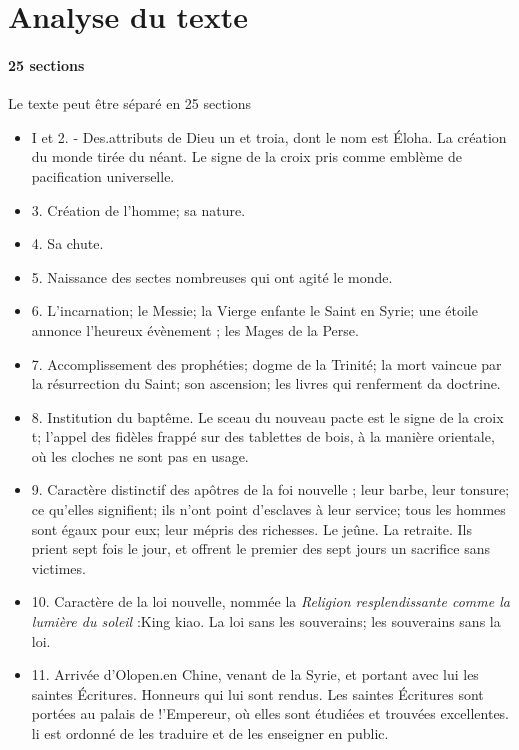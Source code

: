\section{Analyse du texte}

\paragraph{25 sections} Le texte peut être séparé en 25 sections \cite{Pauthier:linscriptionSinganfou,p.24}
\begin{itemize}
    \item  I et 2. - Des.attributs de Dieu un et troia, dont le nom est Éloha. La création du monde tirée du néant. Le signe de la croix pris comme emblème de pacification universelle.
    \item 3. Création de l'homme; sa nature.
    \item 4. Sa chute. 
    \item 5. Naissance des sectes nombreuses qui ont agité le monde. 
    \item 6. L'incarnation; le Messie; la Vierge enfante le Saint en Syrie; une étoile annonce l'heureux évènement
; les Mages de la Perse. 
    \item 7. Accomplissement des prophéties; dogme de la Trinité; la mort vaincue par la résurrection du Saint; son ascension; les
livres qui renferment da doctrine. 
    \item 8. Institution du baptême. Le sceau du nouveau
pacte est le signe de la croix t; l'appel des fidèles frappé sur des tablettes
de bois, à la manière orientale, où les cloches ne sont pas en usage. 
    \item 9. Caractère
distinctif des apôtres de la foi nouvelle ; leur barbe, leur tonsure; ce qu'elles
signifient; ils n'ont point d'esclaves à leur service; tous les hommes sont égaux
pour eux; leur mépris des richesses. Le jeûne. La retraite. Ils prient sept fois le
jour, et offrent le premier des sept jours un sacrifice sans victimes.
    \item 10. Caractère
de la loi nouvelle, nommée la \textit{Religion resplendissante comme la lumière du
soleil }:King kiao. La loi sans les souverains; les souverains sans la loi. 
    \item
11. Arrivée d'Olopen.en Chine, venant de la Syrie, et portant avec lui les saintes
Écritures. Honneurs qui lui sont rendus. Les saintes Écritures sont portées au
palais de !'Empereur, où elles sont étudiées et trouvées excellentes. li est ordonné
de les traduire et de les enseigner en public. 

\end{itemize}
